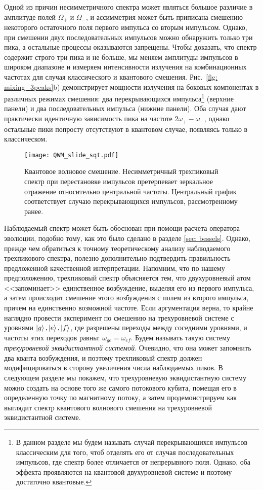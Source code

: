 Одной из причин несимметричного спектра может являться большое различие в амплитуде полей $\Omega_+$ и $\Omega_-$, и ассимметрия может быть приписана смешению некоторого остаточного поля первого импульса со вторым импульсом. Однако, при смешении двух последовательных импульсов можно обнаружить только три пика, а остальные процессы оказываются запрещены. Чтобы доказать, что спектр содержит строго три пика и не больше, мы меняем амплитуды импульсов в широком диапазоне и измеряем интенсивности излучения на комбинационных частотах для случая классического и квантового смешения. Рис.~\ref{fig: mixing_3peaks}b) демонстрирует мощности излучения на боковых компонентах в различных режимах смешения: два перекрывающихся импульса\footnote{В данном разделе мы будем называть случай перекрывающихся импульсов классическим для того, чтоб отделять его от случая последовательных импульсов, где спектр более отличается от непрерывного поля. Однако, оба эффекта проявляются на квантовой двухуровневой системе и поэтому достаточно квантовые.} (верхние панели) и два последовательных импульса (нижние панели). Оба случая дают практически идентичную зависимость пика на частоте  $2\omega_+ - \omega_-$, однако остальные пики попросту отсутствуют в квантовом случае, появляясь только в классическом. 
\begin{figure}[th]
\centering
\texttt{[image: QWM\_slide\_sqt.pdf]}
\caption[Квантовое волновое смешение в зависимость от порядка импульсов]{Квантовое волновое смешение. Несимметричный трехпиковый спектр при перестановке импульсов претерпевает зеркальное отражение относительно центральной частоты. Центральный график соответствует случаю перекрывающихся импульсов, рассмотренному ранее. }
\label{fig: mixing_mirror}
\end{figure}

Наблюдаемый спектр может быть обоснован при помощи расчета оператора эволюции, подобно тому, как это было сделано в разделе \ref{sec: bessels}. Однако, прежде чем обратиться к точному теоретическому анализу наблюдаемого трехпикового спектра, полезно дополнительно подтвердить правильность предложенной качественной интерпретации. Напомним, что по нашему предположению, трехпиковый спектр объясняется тем, что двухуровневый атом <<запоминает>> единственное возбуждение, выделяя его из первого импульса, а затем происходит смешение этого возбуждения с полем из второго импульса, причем на единственно возможной частоте. Если аргументация верна, то крайне наглядно провести эксперимент по смешению на трехуровневой системе с уровнями $\ket{g}, \ket{e}, \ket{f}$, где разрешены переходы между соседними уровнями, и частоты этих переходов равны: $\omega_{ge} = \omega_{ef}$. Будем называть такую систему \textit{трехуровневой эквидистантной системой}. Очевидно, что она может запомнить два кванта возбуждения, и поэтому трехпиковый спектр должен модифицироваться в сторону увеличения числа наблюдаемых пиков. В следующем разделе мы покажем, что трехуровневую эквидистантную систему можно создать на основе того же самого потокового кубита, помещая его в определенную точку по магнитному потоку, а затем продемонстрируем как выглядит спектр квантового волнового смешения на трехуровневой эквидистантной системе. 
